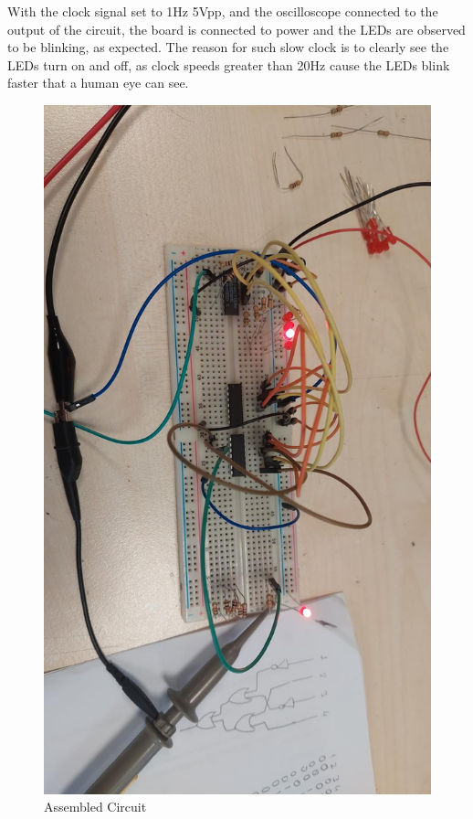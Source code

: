 \documentclass[a4paper, 12pt]{article}
\begin{document}
With the clock signal set to 1Hz 5Vpp, and the oscilloscope connected to the output of the circuit, the board is connected to power and the LEDs are observed to be blinking, as expected.
The reason for such slow clock is to clearly see the LEDs turn on and off, as clock speeds greater than 20Hz cause the LEDs blink faster that a human eye can see.
\begin{figure}
	\vspace{-1cm}
	\centering
	\includegraphics[width=\textwidth]{circuit.jpg}
	\caption{Assembled Circuit}
	\label{fig:circuit}
\end{figure}
\end{document}
